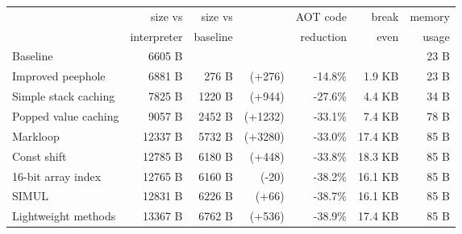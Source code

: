 
\begin{tabular}{lrrrrrr}
\toprule
                          & size vs     & size vs  &                      & AOT code  &   break & memory    \\
                          & interpreter & baseline &                      & reduction &   even  & usage     \\
\midrule
Baseline                  &     6605 B  &          &                      &           &         & 23 B      \\
Improved peephole         &     6881 B  &   276 B  & \scriptsize   (+276) &  -14.8\%  &  1.9 KB & 23 B      \\
Simple stack caching      &     7825 B  &  1220 B  & \scriptsize   (+944) &  -27.6\%  &  4.4 KB & 34 B      \\
Popped value caching      &     9057 B  &  2452 B  & \scriptsize  (+1232) &  -33.1\%  &  7.4 KB & 78 B      \\
Markloop                  &    12337 B  &  5732 B  & \scriptsize  (+3280) &  -33.0\%  & 17.4 KB & 85 B      \\
Const shift               &    12785 B  &  6180 B  & \scriptsize   (+448) &  -33.8\%  & 18.3 KB & 85 B      \\
16-bit array index        &    12765 B  &  6160 B  & \scriptsize    (-20) &  -38.2\%  & 16.1 KB & 85 B      \\
SIMUL                     &    12831 B  &  6226 B  & \scriptsize    (+66) &  -38.7\%  & 16.1 KB & 85 B      \\
Lightweight methods       &    13367 B  &  6762 B  & \scriptsize   (+536) &  -38.9\%  & 17.4 KB & 85 B      \\
\bottomrule
\end{tabular}